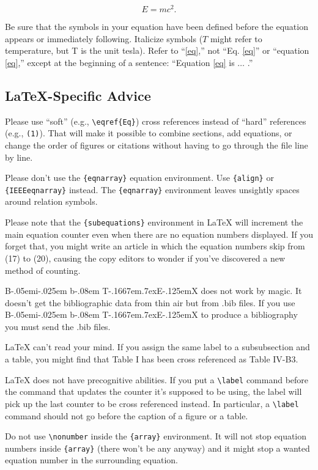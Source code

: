 \documentclass{ieeeaccess}
\def\BibTeX{{\rm B\kern-.05em{\sc i\kern-.025em b}\kern-.08em
    T\kern-.1667em\lower.7ex\hbox{E}\kern-.125emX}}
\begin{document}
\begin{equation}E=mc^2.\label{eq}\end{equation}

Be sure that the symbols in your equation have been defined before the
equation appears or immediately following. Italicize symbols ($T$ might refer
to temperature, but T is the unit tesla). Refer to ``\eqref{eq},'' not ``Eq. \eqref{eq}''
or ``equation \eqref{eq},'' except at the beginning of a sentence: ``Equation \eqref{eq}
is $\ldots$ .''

\subsection{\LaTeX-Specific Advice}

Please use ``soft'' (e.g., \verb|\eqref{Eq}|) cross references instead
of ``hard'' references (e.g., \verb|(1)|). That will make it possible
to combine sections, add equations, or change the order of figures or
citations without having to go through the file line by line.

Please don't use the \verb|{eqnarray}| equation environment. Use
\verb|{align}| or \verb|{IEEEeqnarray}| instead. The \verb|{eqnarray}|
environment leaves unsightly spaces around relation symbols.

Please note that the \verb|{subequations}| environment in {\LaTeX}
will increment the main equation counter even when there are no
equation numbers displayed. If you forget that, you might write an
article in which the equation numbers skip from (17) to (20), causing
the copy editors to wonder if you've discovered a new method of
counting.

    {\BibTeX} does not work by magic. It doesn't get the bibliographic
data from thin air but from .bib files. If you use {\BibTeX} to produce a
bibliography you must send the .bib files.

    {\LaTeX} can't read your mind. If you assign the same label to a
subsubsection and a table, you might find that Table I has been cross
referenced as Table IV-B3.

{\LaTeX} does not have precognitive abilities. If you put a
\verb|\label| command before the command that updates the counter it's
supposed to be using, the label will pick up the last counter to be
cross referenced instead. In particular, a \verb|\label| command
should not go before the caption of a figure or a table.

Do not use \verb|\nonumber| inside the \verb|{array}| environment. It
will not stop equation numbers inside \verb|{array}| (there won't be
any anyway) and it might stop a wanted equation number in the
surrounding equation.
\end{document}
